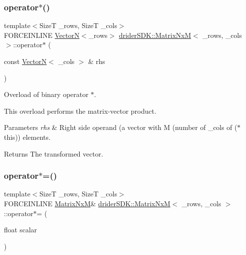 \subsubsection{\texorpdfstring{operator$\ast$()}{operator*()}}
{\footnotesize\ttfamily template$<$SizeT \+\_\+rows, SizeT \+\_\+cols$>$ \\
F\+O\+R\+C\+E\+I\+N\+L\+I\+NE \hyperlink{classdrider_s_d_k_1_1_vector_n}{VectorN}$<$\+\_\+rows$>$ \hyperlink{classdrider_s_d_k_1_1_matrix_nx_m}{drider\+S\+D\+K\+::\+Matrix\+NxM}$<$ \+\_\+rows, \+\_\+cols $>$\+::operator$\ast$ (\begin{DoxyParamCaption}\item[{const \hyperlink{classdrider_s_d_k_1_1_vector_n}{VectorN}$<$ \+\_\+cols $>$ \&}]{rhs }\end{DoxyParamCaption})\hspace{0.3cm}{\ttfamily [inline]}}

Overload of binary operator $\ast$.

This overload performs the matrix-\/vector product.


\begin{DoxyParams}{Parameters}
{\em rhs} & Right side operand (a vector with M (number of \+\_\+cols of ($\ast$this)) elements.\\
\hline
\end{DoxyParams}
\begin{DoxyReturn}{Returns}
The transformed vector. 
\end{DoxyReturn}
\mbox{\label{classdrider_s_d_k_1_1_matrix_nx_m_a437229488a712e6e1da52915cfa8bdef}} 
\subsubsection{\texorpdfstring{operator$\ast$=()}{operator*=()}}
{\footnotesize\ttfamily template$<$SizeT \+\_\+rows, SizeT \+\_\+cols$>$ \\
F\+O\+R\+C\+E\+I\+N\+L\+I\+NE \hyperlink{classdrider_s_d_k_1_1_matrix_nx_m}{Matrix\+NxM}\& \hyperlink{classdrider_s_d_k_1_1_matrix_nx_m}{drider\+S\+D\+K\+::\+Matrix\+NxM}$<$ \+\_\+rows, \+\_\+cols $>$\+::operator$\ast$= (\begin{DoxyParamCaption}\item[{float}]{scalar }\end{DoxyParamCaption})\hspace{0.3cm}{\ttfamily [inline]}}

